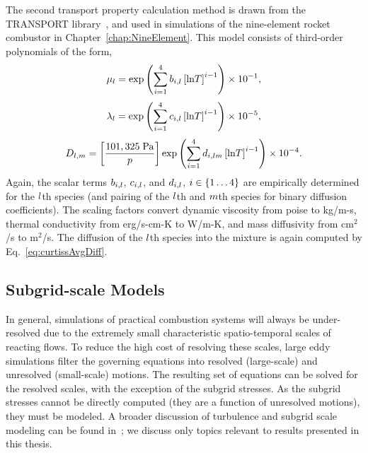 The second transport property calculation method is drawn from the TRANSPORT library~\cite{Kee1998}, and used in simulations of the nine-element rocket combustor in Chapter~\ref{chap:NineElement}. This model consists of third-order polynomials of the form,
%
\begin{equation}
	\mu_{l} = \text{exp} \left( \sum_{i=1}^4 b_{i,l} \left[\text{ln}T\right]^{i - 1} \right) \times 10^{-1},
\end{equation}
%
\begin{equation}
	\lambda_{l} = \text{exp} \left( \sum_{i=1}^4 c_{i,l} \left[\text{ln}T\right]^{i - 1} \right) \times 10^{-5},
\end{equation}
%
\begin{equation}
	D_{l, m} = \left[\frac{101,325 \; \text{Pa}}{p}\right] \text{exp} \left( \sum_{i=1}^4 d_{i,l m} \left[\text{ln}T\right]^{i - 1} \right) \times 10^{-4}.
\end{equation}
%
Again, the scalar terms $b_{i,l}$, $c_{i,l}$, and $d_{i,l}$, $i \in \{1 \hdots 4\}$ are empirically determined for the $l$th species (and pairing of the $l$th and $m$th species for binary diffusion coefficients). The scaling factors convert dynamic viscosity from poise to kg/m-s, thermal conductivity from erg/s-cm-K to W/m-K, and mass diffusivity from cm$^2$/s to m$^2$/s. The diffusion of the $l$th species into the mixture is again computed by Eq.~\ref{eq:curtissAvgDiff}.

\subsection{Subgrid-scale Models}

In general, simulations of practical combustion systems will always be under-resolved due to the extremely small characteristic spatio-temporal scales of reacting flows. To reduce the high cost of resolving these scales, large eddy simulations filter the governing equations into resolved (large-scale) and unresolved (small-scale) motions. The resulting set of equations can be solved for the resolved scales, with the exception of the subgrid stresses. As the subgrid stresses cannot be directly computed (they are a function of unresolved motions), they must be modeled. A broader discussion of turbulence and subgrid scale modeling can be found in~\cite{Pope2000}; we discuss only topics relevant to results presented in this thesis.

